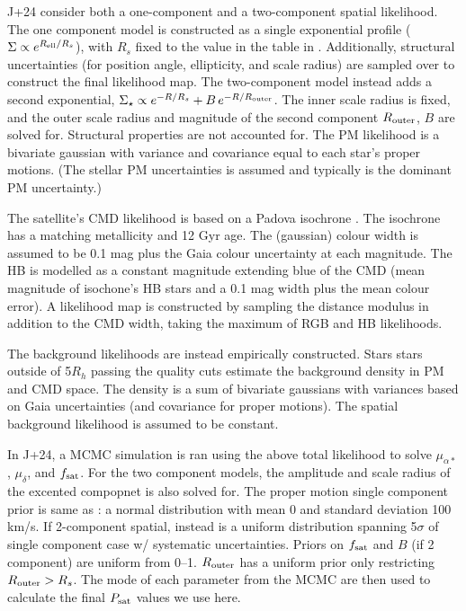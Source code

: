 J+24 consider both a one-component and a two-component spatial
likelihood. The one component model is constructed as a single
exponential profile (\(\Sigma \propto e^{R_{\rm ell} / R_s}\)), with
\(R_s\) fixed to the value in the table in \citet{MV2020a}.
Additionally, structural uncertainties (for position angle, ellipticity,
and scale radius) are sampled over to construct the final likelihood
map. The two-component model instead adds a second exponential,
\(\Sigma_\star \propto e^{-R/R_s} + B\,e^{-R/R_{\rm outer}}\). The inner
scale radius is fixed, and the outer scale radius and magnitude of the
second component \(R_{\rm outer}\), \(B\) are solved for. Structural
properties are not accounted for. The PM likelihood is a bivariate
gaussian with variance and covariance equal to each star's proper
motions. (The stellar PM uncertainties is assumed and typically is the
dominant PM uncertainty.)

The satellite's CMD likelihood is based on a Padova isochrone
\citep{girardi+2002}. The isochrone has a matching metallicity and 12
Gyr age. The (gaussian) colour width is assumed to be 0.1 mag plus the
Gaia colour uncertainty at each magnitude. The HB is modelled as a
constant magnitude extending blue of the CMD (mean magnitude of
isochone's HB stars and a 0.1 mag width plus the mean colour error). A
likelihood map is constructed by sampling the distance modulus in
addition to the CMD width, taking the maximum of RGB and HB likelihoods.

The background likelihoods are instead empirically constructed. Stars
stars outside of 5\(R_h\) passing the quality cuts estimate the
background density in PM and CMD space. The density is a sum of
bivariate gaussians with variances based on Gaia uncertainties (and
covariance for proper motions). The spatial background likelihood is
assumed to be constant.

In J+24, a MCMC simulation is ran using the above total likelihood to
solve \(\mu_{\alpha*}\), \(\mu_\delta\), and \(f_{\rm sat}\). For the
two component models, the amplitude and scale radius of the excented
compopnet is also solved for. The proper motion single component prior
is same as \citet{MV2020a}: a normal distribution with mean 0 and
standard deviation 100 km/s. If 2-component spatial, instead is a
uniform distribution spanning 5\(\sigma\) of single component case w/
systematic uncertainties. Priors on \(f_{\rm sat}\) and \(B\) (if 2
component) are uniform from 0--1. \(R_{\rm outer}\) has a uniform prior
only restricting \(R_{\rm outer} > R_s\). The mode of each parameter
from the MCMC are then used to calculate the final \(P_{\rm sat}\)
values we use here.

